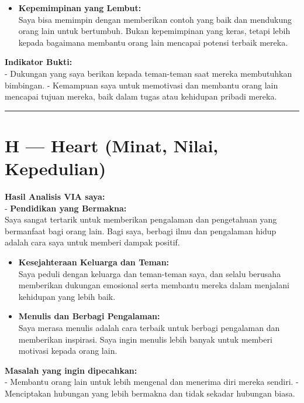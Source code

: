\documentclass[
  letterpaper,
  DIV=11,
  numbers=noendperiod]{scrreprt}
\providecommand{\tightlist}{%
  \setlength{\itemsep}{0pt}\setlength{\parskip}{0pt}}
\begin{document}
\begin{itemize}
\tightlist
\item
  \textbf{Kepemimpinan yang Lembut:}\\
  Saya bisa memimpin dengan memberikan contoh yang baik dan mendukung
  orang lain untuk bertumbuh. Bukan kepemimpinan yang keras, tetapi
  lebih kepada bagaimana membantu orang lain mencapai potensi terbaik
  mereka.
\end{itemize}

\textbf{Indikator Bukti:}\\
- Dukungan yang saya berikan kepada teman-teman saat mereka membutuhkan
bimbingan. - Kemampuan saya untuk memotivasi dan membantu orang lain
mencapai tujuan mereka, baik dalam tugas atau kehidupan pribadi mereka.

\begin{center}\rule{0.5\linewidth}{0.5pt}\end{center}

\section{H --- Heart (Minat, Nilai,
Kepedulian)}\label{h-heart-minat-nilai-kepedulian}

\textbf{Hasil Analisis VIA saya:}\\
- \textbf{Pendidikan yang Bermakna:}\\
Saya sangat tertarik untuk memberikan pengalaman dan pengetahuan yang
bermanfaat bagi orang lain. Bagi saya, berbagi ilmu dan pengalaman hidup
adalah cara saya untuk memberi dampak positif.

\begin{itemize}
\item
  \textbf{Kesejahteraan Keluarga dan Teman:}\\
  Saya peduli dengan keluarga dan teman-teman saya, dan selalu berusaha
  memberikan dukungan emosional serta membantu mereka dalam menjalani
  kehidupan yang lebih baik.
\item
  \textbf{Menulis dan Berbagi Pengalaman:}\\
  Saya merasa menulis adalah cara terbaik untuk berbagi pengalaman dan
  memberikan inspirasi. Saya ingin menulis lebih banyak untuk memberi
  motivasi kepada orang lain.
\end{itemize}

\textbf{Masalah yang ingin dipecahkan:}\\
- Membantu orang lain untuk lebih mengenal dan menerima diri mereka
sendiri. - Menciptakan hubungan yang lebih bermakna dan tidak sekadar
hubungan biasa.
\end{document}
